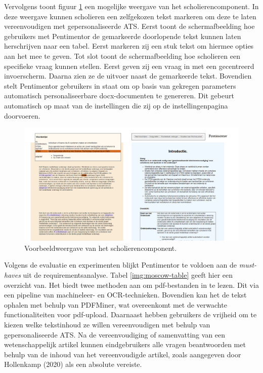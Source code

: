 Vervolgens toont figuur \ref{img:pentimentor-afbeelding} een mogelijke weergave van het scholierencomponent. In deze weergave kunnen scholieren een zelfgekozen tekst markeren om deze te laten vereenvoudigen met gepersonaliseerde ATS. Eerst toont de schermafbeelding hoe gebruikers met Pentimentor de gemarkeerde doorlopende tekst kunnen laten herschrijven naar een tabel. Eerst markeren zij een stuk tekst om hiermee opties aan het mee te geven. Tot slot toont de schermafbeelding hoe scholieren een specifieke vraag kunnen stellen. Eerst geven zij een vraag in met een gecentreerd invoerscherm. Daarna zien ze de uitvoer naast de gemarkeerde tekst. Bovendien stelt Pentimentor gebruikers in staat om op basis van gekregen parameters automatisch personaliseerbare docx-documenten te genereren. Dit gebeurt automatisch op maat van de instellingen die zij op de instellingenpagina doorvoeren.

\begin{center}
	\begin{figure}[H]
		\includegraphics[width=\linewidth]{img/pentimentor-afbeelding}
		\caption{Voorbeeldweergave van het scholierencomponent.}
		\label{img:pentimentor-afbeelding}
	\end{figure}
\end{center}

Volgens de evaluatie en experimenten blijkt Pentimentor te voldoen aan de \textit{must-haves} uit de requirementsanalyse. Tabel \ref{img:moscow-table} geeft hier een overzicht van. Het biedt twee methoden aan om pdf-bestanden in te lezen. Dit via een pipeline van machineleer- en OCR-technieken. Bovendien kan het de tekst ophalen met behulp van PDFMiner, wat overeenkomt met de verwachte functionaliteiten voor pdf-upload. Daarnaast hebben gebruikers de vrijheid om te kiezen welke tekstinhoud ze willen vereenvoudigen met behulp van gepersonaliseerde ATS. Na de vereenvoudiging of samenvatting van een wetenschappelijk artikel kunnen eindgebruikers alle vragen beantwoorden met behulp van de inhoud van het vereenvoudigde artikel, zoals aangegeven door Hollenkamp (2020) als een absolute vereiste.

